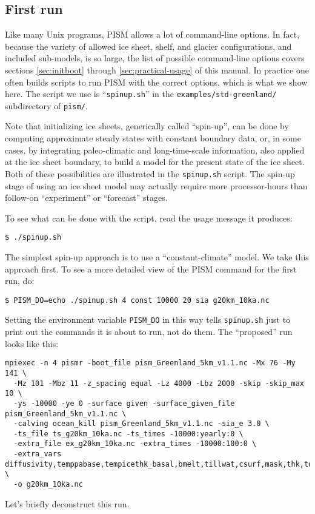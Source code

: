 \subsection{First run}   \label{subsect:runscript}  Like many Unix programs, PISM allows a lot of command-line options.  In fact, because the variety of allowed ice sheet, shelf, and glacier configurations, and included sub-models, is so large, the list of possible command-line options covers sections \ref{sec:initboot} through \ref{sec:practical-usage} of this manual.  In practice one often builds scripts to run PISM with the correct options, which is what we show here.  The script we use is ``\texttt{spinup.sh}'' in the \texttt{examples/std-greenland/} subdirectory of \texttt{pism/}.

Note that initializing ice sheets, generically called ``spin-up'', can be done by computing approximate steady states with constant boundary data, or, in some cases, by integrating paleo-climatic and long-time-scale information, also applied at the ice sheet boundary, to build a model for the present state of the ice sheet.  Both of these possibilities are illustrated in the \texttt{spinup.sh} script.  The spin-up stage of using an ice sheet model may actually require more processor-hours than follow-on ``experiment'' or ``forecast'' stages.

To see what can be done with the script, read the usage message it produces:
\begin{verbatim}
$ ./spinup.sh
\end{verbatim}

The simplest spin-up approach is to use a ``constant-climate'' model.  We take this approach first.  To see a more detailed view of the PISM command for the first run, do:
\begin{verbatim}
$ PISM_DO=echo ./spinup.sh 4 const 10000 20 sia g20km_10ka.nc
\end{verbatim}
Setting the environment variable \texttt{PISM_DO} in this way tells \texttt{spinup.sh} just to print out the commands it is about to run, not do them.  The ``proposed'' run looks like this:
\label{firstcommand}
\small
\begin{verbatim}
mpiexec -n 4 pismr -boot_file pism_Greenland_5km_v1.1.nc -Mx 76 -My 141 \
  -Mz 101 -Mbz 11 -z_spacing equal -Lz 4000 -Lbz 2000 -skip -skip_max 10 \
  -ys -10000 -ye 0 -surface given -surface_given_file pism_Greenland_5km_v1.1.nc \
  -calving ocean_kill pism_Greenland_5km_v1.1.nc -sia_e 3.0 \
  -ts_file ts_g20km_10ka.nc -ts_times -10000:yearly:0 \
  -extra_file ex_g20km_10ka.nc -extra_times -10000:100:0 \
  -extra_vars diffusivity,temppabase,tempicethk_basal,bmelt,tillwat,csurf,mask,thk,topg,usurf \
  -o g20km_10ka.nc
\end{verbatim}
\normalsize
Let's briefly deconstruct this run.

